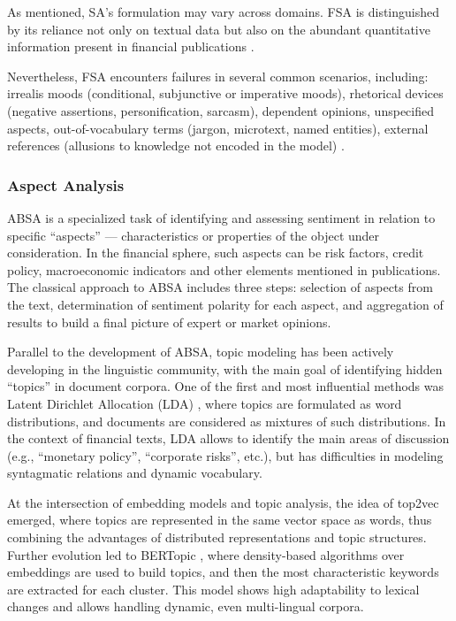 As mentioned, SA's formulation may vary across domains. FSA is distinguished by its reliance not only
on textual data but also on the abundant quantitative information present in financial publications
\parencite{FSA2024techniques}.

Nevertheless, FSA encounters failures in several common scenarios, including: irrealis moods (conditional,
subjunctive or imperative moods), rhetorical devices (negative assertions, personification, sarcasm),
dependent opinions, unspecified aspects, out-of-vocabulary terms (jargon, microtext, named entities),
external references (allusions to knowledge not encoded in the model) \parencite{FSA2020problems}.

\subsubsection{Aspect Analysis}
\label{sec:absa}
ABSA is a specialized task of identifying and assessing sentiment in relation to specific “aspects” ---
characteristics or properties of the object under consideration. In the financial sphere, such aspects
can be risk factors, credit policy, macroeconomic indicators and other elements mentioned in publications.
The classical approach to ABSA includes three steps: selection of aspects from the text, determination
of sentiment polarity for each aspect, and aggregation of results to build a final picture of expert
or market opinions.

Parallel to the development of ABSA, topic modeling has been actively developing in the linguistic community,
with the main goal of identifying hidden “topics” in document corpora. One of the first and most influential
methods was Latent Dirichlet Allocation (LDA) \parencite{LDA2003}, where topics are formulated as word
distributions, and documents are considered as mixtures of such distributions. In the context of financial
texts, LDA allows to identify the main areas of discussion (e.g., “monetary policy”, “corporate risks”, etc.),
but has difficulties in modeling syntagmatic relations and dynamic vocabulary.

At the intersection of embedding models and topic analysis, the idea of top2vec \parencite{angelov2020top2vec}
emerged, where topics are represented in the same vector space as words, thus combining the advantages
of distributed representations and topic structures. Further evolution led to BERTopic \parencite{BERTopic2022},
where density-based algorithms over embeddings are used to build topics, and then the most characteristic keywords
are extracted for each cluster. This model shows high adaptability to lexical changes and allows handling dynamic,
even multi-lingual corpora.

